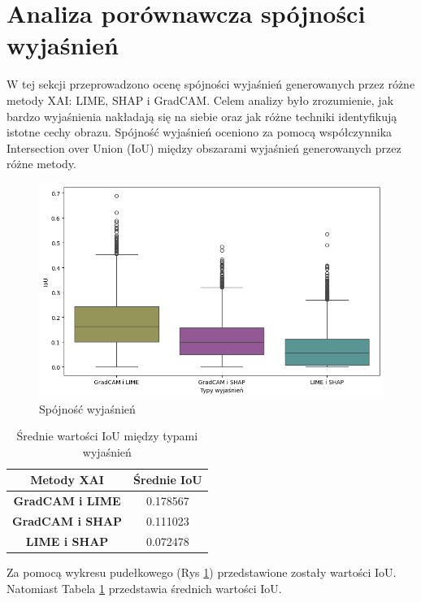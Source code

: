 \section*{Analiza porównawcza spójności wyjaśnień}

W tej sekcji przeprowadzono ocenę spójności wyjaśnień generowanych przez różne metody XAI: LIME, SHAP i GradCAM.
Celem analizy było zrozumienie, jak bardzo wyjaśnienia nakładają się na siebie oraz jak różne techniki identyfikują istotne cechy obrazu.
Spójność wyjaśnień oceniono za pomocą współczynnika Intersection over Union (IoU) między obszarami wyjaśnień generowanych przez różne metody.

\begin{figure}[h]
	\centering\includegraphics[width=.9\textwidth]{img/base_coherence}
	\caption{Spójność wyjaśnień}  \label{rys:base_coherence}
\end{figure}

\begin{table}[h]
	\centering
	\begin{tabular}{|c|c|}
		\hline
		\textbf{Metody XAI}     & \textbf{Średnie IoU} \\
		\hline
		\textbf{GradCAM i LIME} & 0.178567             \\
		\hline
		\textbf{GradCAM i SHAP} & 0.111023             \\
		\hline
		\textbf{LIME i SHAP}    & 0.072478             \\
		\hline
	\end{tabular}
	\caption{Średnie wartości IoU między typami wyjaśnień}
	\label{tab:base_coherence}
\end{table}

Za pomocą wykresu pudełkowego (Rys \ref{rys:base_coherence}) przedstawione zostały wartości IoU.
Natomiast Tabela \ref{tab:base_coherence} przedstawia średnich wartości IoU.

